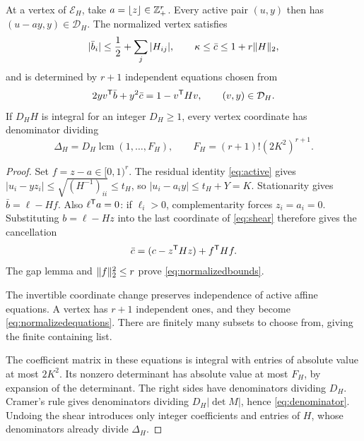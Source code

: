 \begin{proposition}\label{prop:templates}
At a vertex of $\mathcal E_H$, take $a=\lfloor z\rfloor\in\mathbb Z_+^r$. Every active pair $(u,y)$ then has $(u-ay,y)\in\mathcal D_H$. The normalized vertex satisfies
\begin{equation}\label{eq:normalizedbounds}
 |\bar b_i|\le\frac12+\sum_j|H_{ij}|,
 \qquad \kappa\le\bar c\le1+r\lVert H\rVert_2,
\end{equation}
and is determined by $r+1$ independent equations chosen from
\begin{equation}\label{eq:normalizedequations}
 2yv^{\mathsf T}\bar b+y^2\bar c=1-v^{\mathsf T} Hv,
 \qquad(v,y)\in\mathcal D_H.
\end{equation}
If $D_HH$ is integral for an integer $D_H\ge1$, every vertex coordinate has denominator dividing
\begin{equation}\label{eq:denominator}
 \Delta_H=D_H\operatorname{lcm}(1,\ldots,F_H),
 \qquad F_H=(r+1)!(2K^2)^{r+1}.
\end{equation}
\end{proposition}
\begin{proof}
Set $f=z-a\in[0,1)^r$. The residual identity \eqref{eq:active} gives
$|u_i-yz_i|\le\sqrt{(H^{-1})_{ii}}\le t_H$, so
$|u_i-a_i y|\le t_H+Y=K$.
Stationarity gives $\bar b=\ell-Hf$. Also $\ell^{\mathsf T} a=0$: if $\ell_i>0$, complementarity forces $z_i=a_i=0$. Substituting $b=\ell-Hz$ into the last coordinate of \eqref{eq:shear} therefore gives the cancellation
\begin{equation}\label{eq:shearcancel}
 \bar c=(c-z^{\mathsf T} Hz)+f^{\mathsf T} Hf.
\end{equation}
The gap lemma and $\lVert f\rVert_2^2\le r$ prove \eqref{eq:normalizedbounds}.

The invertible coordinate change preserves independence of active affine equations. A vertex has $r+1$ independent ones, and they become \eqref{eq:normalizedequations}. There are finitely many subsets to choose from, giving the finite containing list.

The coefficient matrix in these equations is integral with entries of absolute value at most $2K^2$. Its nonzero determinant has absolute value at most $F_H$, by expansion of the determinant. The right sides have denominators dividing $D_H$. Cramer's rule gives denominators dividing $D_H|\det M|$, hence \eqref{eq:denominator}. Undoing the shear introduces only integer coefficients and entries of $H$, whose denominators already divide $\Delta_H$.
\end{proof}

